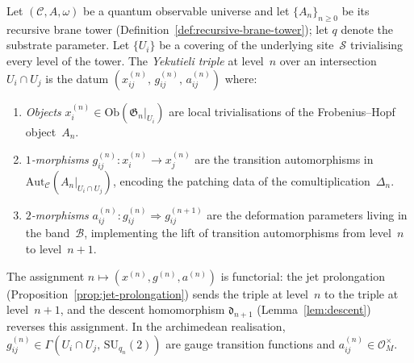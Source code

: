 \begin{definition}
\label{def:yekutieli-triple}
Let $(\mathcal{C}, A, \omega)$ be a quantum observable universe and let
$\{A_n\}_{n \geq 0}$ be its recursive brane tower
(Definition~\ref{def:recursive-brane-tower}); let $q$ denote the substrate parameter.  Let $\{U_i\}$ be a covering
of the underlying site~$\mathcal{S}$ trivialising every level of the tower.
The \emph{Yekutieli triple} at level~$n$ over an intersection
$U_i \cap U_j$ is the datum $(x_{ij}^{(n)},\, g_{ij}^{(n)},\, a_{ij}^{(n)})$
where:
\begin{enumerate}
  \item \emph{Objects} $x_i^{(n)} \in \mathrm{Ob}(\mathfrak{G}_n|_{U_i})$
        are local trivialisations of the Frobenius--Hopf object~$A_n$.
  \item \emph{$1$-morphisms} $g_{ij}^{(n)} \colon x_i^{(n)} \to x_j^{(n)}$
        are the transition automorphisms in
        $\mathrm{Aut}_{\mathcal{C}}(A_n|_{U_i \cap U_j})$, encoding the
        patching data of the comultiplication~$\Delta_n$.
  \item \emph{$2$-morphisms}
        $a_{ij}^{(n)} \colon g_{ij}^{(n)} \Rightarrow g_{ij}^{(n+1)}$
        are the deformation parameters living in the band~$\mathcal{B}$,
        implementing the lift of transition automorphisms from level~$n$ to
        level~$n{+}1$.
\end{enumerate}
The assignment $n \mapsto (x^{(n)}, g^{(n)}, a^{(n)})$ is functorial:
the jet prolongation
(Proposition~\ref{prop:jet-prolongation}) sends the triple at level~$n$
to the triple at level~$n{+}1$, and the descent homomorphism
$\mathfrak{d}_{n+1}$ (Lemma~\ref{lem:descent}) reverses this assignment.
In the archimedean realisation, $g_{ij}^{(n)} \in
\Gamma(U_i \cap U_j,\, \mathrm{SU}_{q_n}(2))$ are gauge transition
functions and $a_{ij}^{(n)} \in \mathcal{O}_M^{\times}$.
\end{definition}

